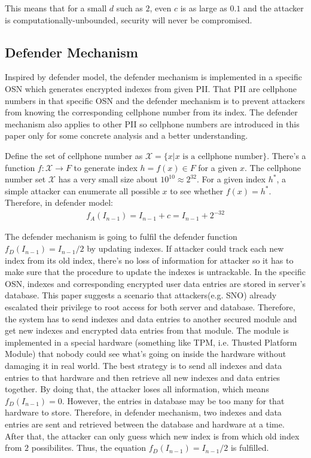 \documentclass[10pt, conference, compsocconf]{IEEEtran}
\begin{document}
		This means that for a small $d$ such as $2$, even $c$ is as large as
		$0.1$ and the attacker is computationally-unbounded, security will
		never be compromised.
		
	\subsection{Defender Mechanism}\label{sec_ds}
		Inspired by defender model, the defender mechanism is implemented
		in a specific OSN
		which generates encrypted indexes
		from given PII. That PII are cellphone numbers
		in that specific OSN and the defender mechanism is to prevent attackers
		from knowing the corresponding cellphone number from its index.
		The defender mechanism also applies to other PII so cellphone numbers are introduced
		in this paper only for some concrete analysis and a better understanding.
		
		Define the set of cellphone number as 
		$\mathcal X = \{x | \text{$x$ is a cellphone number}\}$.
		There's a function $f: \mathcal X \rightarrow F$ to generate index $h = f(x) \in F$ for
		a given $x$. The cellphone number set $\mathcal X$ has a very small
		size about $10^{10} \approx 2^{32}$. For a given index $h^*$, a simple attacker
		can enumerate all possible $x$ to see whether $f(x) = h^*$. Therefore, in defender
		model:
		\begin{align*}
			f_A(I_{n-1}) = I_{n-1}+c = I_{n-1}+2^{-32}
		\end{align*}
		
		The defender mechanism is going to fulfil the defender
		function $f_D(I_{n-1}) = I_{n-1}/2$ by updating indexes.
		If attacker
		could track each new index from its old index, there's no loss of information 
		for attacker so it has to make sure that the procedure to update the indexes
		is untrackable.
		In the specific OSN, indexes and corresponding encrypted user data entries are stored
		in server's database. 
		This paper suggests a scenario that attackers(e.g. SNO) already
		escalated their privilege to root access for
		both server and database. Therefore, the system has to send 
		indexes and data entries to another 
		secured module and get new indexes and encrypted data 
		entries from that module. 
		The module is implemented in a special hardware (something 
		like TPM, i.e. Thusted Platform Module) that nobody
		could see what's going on inside the hardware without damaging it in real world.
		The best strategy 
		is to send all indexes and data entries to that hardware and then
		retrieve all new indexes and data entries together. By doing that, the attacker
		loses all information, which means $f_D(I_{n-1}) = 0$. However, the entries
		in database may be too many for that hardware to store. Therefore, in defender mechanism,
		two indexes and data entries are sent and retrieved
		between the database and hardware at a time. After that, the attacker can
		only guess which new index is from which old index from $2$ possibilites.
		Thus, the equation $f_D(I_{n-1}) = I_{n-1}/2$ is fulfilled.
		
\end{document}
